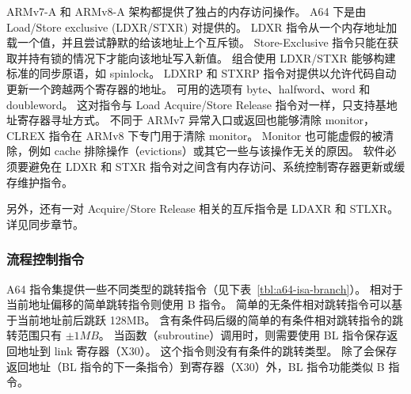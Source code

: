 ARMv7-A 和 ARMv8-A 架构都提供了独占的内存访问操作。
A64 下是由 Load/Store exclusive (LDXR/STXR) 对提供的。
LDXR 指令从一个内存地址加载一个值，并且尝试静默的给该地址上个互斥锁。
Store-Exclusive 指令只能在获取并持有锁的情况下才能向该地址写入新值。
组合使用 LDXR/STXR 能够构建标准的同步原语，如 spinlock。
LDXRP 和 STXRP 指令对提供以允许代码自动更新一个跨越两个寄存器的地址。
可用的选项有 byte、halfword、word 和 doubleword。
这对指令与 Load Acquire/Store Release 指令对一样，只支持基地址寄存器寻址方式。
不同于 ARMv7 异常入口或返回也能够清除 monitor，CLREX 指令在 ARMv8 下专门用于清除 monitor。
Monitor 也可能虚假的被清除，例如 cache 排除操作（evictions）或其它一些与该操作无关的原因。
软件必须要避免在 LDXR 和 STXR 指令对之间含有内存访问、系统控制寄存器更新或缓存维护指令。

另外，还有一对 Acquire/Store Release 相关的互斥指令是 LDAXR 和 STLXR。
详见同步章节。

\subsubsection{流程控制指令}

A64 指令集提供一些不同类型的跳转指令（见下表~\ref{tbl:a64-isa-branch}）。
相对于当前地址偏移的简单跳转指令则使用 B 指令。
简单的无条件相对跳转指令可以基于当前地址前后跳跃 128MB。
含有条件码后缀的简单的有条件相对跳转指令的跳转范围只有 $\pm1MB$。
当函数（subroutine）调用时，则需要使用 BL 指令保存返回地址到 link 寄存器（X30）。
这个指令则没有有条件的跳转类型。
除了会保存返回地址（BL 指令的下一条指令）到寄存器（X30）外，BL 指令功能类似 B 指令。

